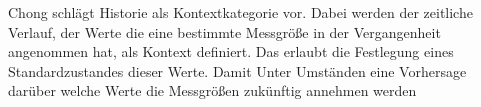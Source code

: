 Chong\cite{chong_context-aware_nodate} schlägt Historie als Kontextkategorie vor. Dabei werden der zeitliche Verlauf, der Werte die eine bestimmte Messgröße in der Vergangenheit angenommen hat, als Kontext definiert. Das erlaubt die Festlegung eines Standardzustandes dieser Werte. Damit  Unter Umständen eine Vorhersage darüber welche Werte die Messgrößen zukünftig annehmen werden



